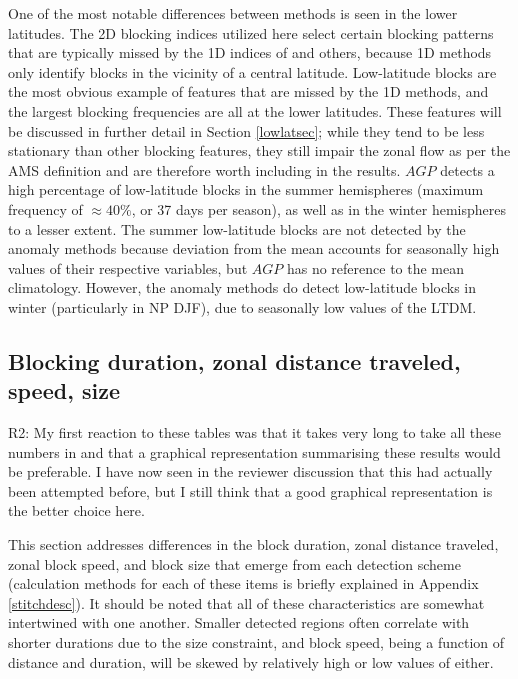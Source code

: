 \documentclass[smallextended]{svjour3}       %
\numberwithin{equation}{section}
\begin{document}
One of the most notable differences between methods is seen in the lower latitudes. The 2D blocking indices utilized here select certain blocking patterns that are typically missed by the 1D indices of \cite{tibaldi_operational_1990} and others, because  1D methods only identify blocks in the vicinity of a central latitude. Low-latitude blocks are the most obvious example of features that are missed by the 1D methods, and the largest blocking frequencies are all at the lower latitudes. These features will be discussed in further detail in Section \ref{lowlatsec}; while they tend to be less stationary than other blocking features, they still impair the zonal flow as per the AMS definition and are therefore worth including in the results. $AGP$ detects a high percentage of low-latitude blocks in the summer hemispheres (maximum frequency of $\approx 40\%$, or 37 days per season), as well as in the winter hemispheres to a lesser extent. The summer low-latitude blocks are not detected by the anomaly methods because deviation from the mean accounts for seasonally high values of their respective variables, but $AGP$ has no reference to the mean climatology. However, the anomaly methods do detect low-latitude blocks in winter (particularly in NP DJF), due to seasonally low values of the LTDM.


\subsection{Blocking duration, zonal distance traveled, speed, size}\label{blockingmetrics}

{\color{teal}R2: My first reaction to these tables was that it takes very long to take all these numbers in and that a graphical representation summarising these results would be preferable. I have now seen in the reviewer discussion that this had actually been attempted before, but I still think that a good graphical representation is the better choice here.}

This section addresses differences in the block duration, zonal distance traveled, zonal block speed, and block size that emerge from each detection scheme (calculation methods for each of these items is briefly explained in Appendix \ref{stitchdesc}).  It should be noted that all of these characteristics are somewhat intertwined with one another. Smaller detected regions often correlate with shorter durations due to the size constraint, and block speed, being a function of distance and duration, will be skewed by relatively high or low values of either. 
\end{document}
